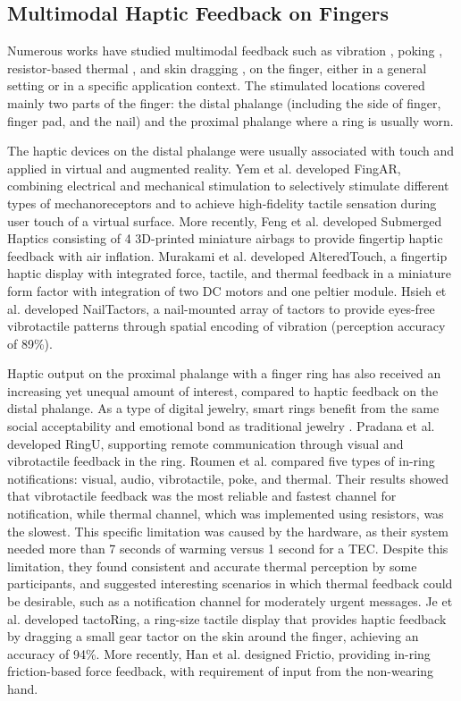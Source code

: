 \documentclass[preprint,12pt]{elsarticle}
\begin{document}
\subsection{Multimodal Haptic Feedback on Fingers}
Numerous works have studied multimodal feedback such as vibration \cite{12,24}, poking \cite{24}, resistor-based thermal \cite{24}, and skin dragging \cite{13}, on the finger, either in a general setting or in a specific application context. The stimulated locations covered mainly two parts of the finger: the distal phalange (including the side of finger, finger pad, and the nail) and the proximal phalange where a ring is usually worn.

The haptic devices on the distal phalange were usually associated with touch and applied in virtual and augmented reality. Yem et al. \cite{44} developed FingAR, combining electrical and mechanical stimulation to selectively stimulate different types of mechanoreceptors and to achieve high-fidelity tactile sensation during user touch of a virtual surface. More recently, Feng et al. \cite{5} developed Submerged Haptics consisting of 4 3D-printed miniature airbags to provide fingertip haptic feedback with air inflation. Murakami et al. \cite{32} developed AlteredTouch, a fingertip haptic display with integrated force, tactile, and thermal feedback in a miniature form factor with  integration of two DC motors and one peltier module. Hsieh et al. \cite{12} developed NailTactors, a nail-mounted array of tactors to provide eyes-free vibrotactile patterns through spatial encoding of vibration (perception accuracy of 89\%).

Haptic output on the proximal phalange with a finger ring has also received an increasing yet unequal amount of interest, compared to haptic feedback on the distal phalange. As a type of digital jewelry, smart rings benefit from the same social acceptability and emotional bond as traditional jewelry \cite{21}. Pradana et al. \cite{22} developed RingU, supporting remote communication through visual and  vibrotactile feedback in the ring. Roumen et al. \cite{24} compared five types of in-ring notifications: visual, audio, vibrotactile, poke, and thermal. Their results showed that vibrotactile feedback was the most reliable and fastest channel for notification, while thermal channel, which was implemented using resistors, was the slowest. This specific limitation was caused by the hardware, as their system needed more than 7 seconds of warming versus 1 second for a TEC. Despite this limitation, they found consistent and accurate thermal perception by some participants, and suggested interesting scenarios in which thermal feedback could be desirable, such as a notification channel for moderately urgent messages. Je et al. \cite{13} developed tactoRing, a ring-size tactile display that provides haptic feedback by dragging a small gear tactor on the skin around the finger, achieving an accuracy of 94\%. More recently, Han et al. \cite{11} designed Frictio, providing in-ring friction-based force feedback, with requirement of input from the non-wearing hand.
\end{document}
